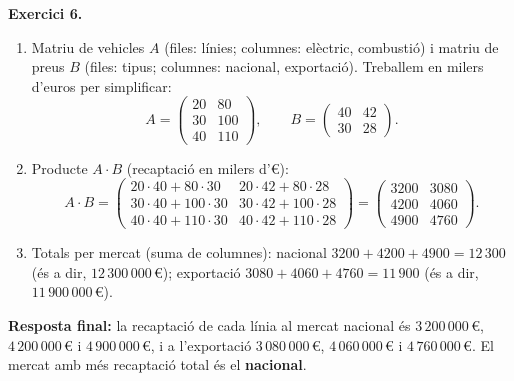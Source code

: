 \documentclass[12pt,a4paper]{article}
\newcommand{\blocInici}{%
  \par\nobreak\vspace{0pt}%
  \begin{minipage}[t]{\linewidth}%
}
\newcommand{\blocFi}{%
  \end{minipage}%
  \par
}
\begin{document}
%
\blocInici
\noindent\textbf{Exercici 6.}
\begin{enumerate}[label=\arabic*.,leftmargin=1.2em,itemsep=0.35em]
  \item Matriu de vehicles $A$ (files: línies; columnes: elèctric, combustió)
    i matriu de preus $B$ (files: tipus; columnes: nacional, exportació).
    Treballem en milers d'euros per simplificar:
    \[
      A =
      \begin{pmatrix}
        20 & 80 \\
        30 & 100 \\
        40 & 110
      \end{pmatrix},
      \qquad
      B =
      \begin{pmatrix}
        40 & 42 \\
        30 & 28
      \end{pmatrix}.
    \]
  \item Producte $A \cdot B$ (recaptació en milers d'\euro{}):
    \[
      A \cdot B =
      \begin{pmatrix}
        20\cdot 40 + 80\cdot 30 & 20\cdot 42 + 80\cdot 28 \\
        30\cdot 40 + 100\cdot 30 & 30\cdot 42 + 100\cdot 28 \\
        40\cdot 40 + 110\cdot 30 & 40\cdot 42 + 110\cdot 28
      \end{pmatrix}
      =
      \begin{pmatrix}
        3200 & 3080 \\
        4200 & 4060 \\
        4900 & 4760
      \end{pmatrix}.
    \]
  \item Totals per mercat (suma de columnes):
    nacional $3200+4200+4900=12\,300$ (és a dir, $12\,300\,000$\,\euro{});
    exportació $3080+4060+4760=11\,900$ (és a dir, $11\,900\,000$\,\euro{}).
\end{enumerate}
\textbf{Resposta final:}
la recaptació de cada línia al mercat nacional és
$3\,200\,000$\,\euro{}, $4\,200\,000$\,\euro{} i $4\,900\,000$\,\euro{},
i a l'exportació $3\,080\,000$\,\euro{}, $4\,060\,000$\,\euro{} i $4\,760\,000$\,\euro{}.
El mercat amb més recaptació total és el \textbf{nacional}.
\blocFi
\end{document}
